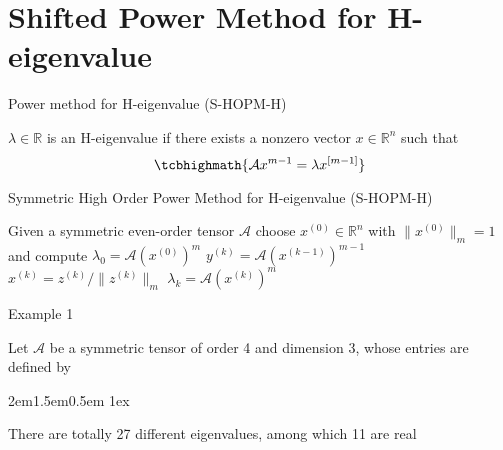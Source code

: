 \documentclass[10pt,compress,t,noamsthm,notheorem,table,handout]{beamer}
\newcommand{\Bullet}{{\fontsize{6pt}{6pt}\selectfont\CircleSolid}}
\newcommand{\zhu}{{\color{blue!40}\Bullet}}
\newenvironment{blist}%
    {\begin{list}{{\hfill\raisebox{1.12pt}{\color{blue!60}\zhu}}}{%
     \leftmargin2em\labelwidth1.5em\labelsep0.5em
     \itemsep1ex\itemindent0pt\parsep0pt\topsep0pt}}
    {\end{list}}
\theoremstyle{nonumberbreak}%
\newcommand{\myem}[2][blue]{{\color{#1} #2}}
\newcommand{\mycite}[1]{\textcolor{red}{\normalfont\upshape{#1}}}
\newcommand{\R}{\mathbb{R}}
\newcommand{\A}{\mathcal{A}}
\begin{document}
\section{Shifted Power Method for H-eigenvalue}

\begin{frame}{Power method for H-eigenvalue (S-HOPM-H)}

  $\lambda\in\R$ is an H-eigenvalue if there exists a nonzero vector
  $x\in\R^n$ such that
  $$ \tcbhighmath{\A x^{m-1}=\lambda x^{[m-1]}} $$

  \myem{Symmetric High Order Power Method for H-eigenvalue (S-HOPM-H)}

  \begin{Block}\linespread{1.4}\selectfont
  \begin{algorithmic}[1]
  \State Given a symmetric \myem{even-order} tensor $\A$
  \State choose $x^{(0)}\in \mathbb{R}^n$ with $\|x^{(0)}\|_m=1$
         and compute $\lambda_0=\A \left(x^{(0)}\right)^m$
  \State $y^{(k)}=\A \left(x^{(k-1)}\right)^{m-1}$\smallskip
  \State \myem{$z^{(k)}=\left(y^{(k)}\right)^{[\frac{1}{m-1}]}$}
  \State $x^{(k)}=z^{(k)}/\|z^{(k)}\|_m$
  \State $\lambda_{k}=\A \left(x^{(k)}\right)^m$
  \EndFor
  \end{algorithmic}
  \end{Block}
\end{frame}


\begin{frame}{Example 1}

\begin{example}[\mycite{[KR '02]}]
Let $\A$ be a symmetric tensor of order 4 and dimension 3,
whose entries are defined by

\end{example}

\begin{blist}
  \item
  There are totally 27 different eigenvalues, among which 11 are real

\end{blist}

\end{frame}
\end{document}
